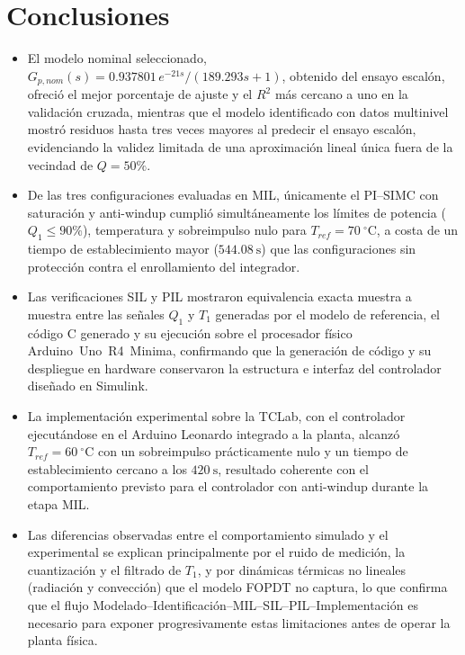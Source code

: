 \documentclass[journal]{IEEEtran}
\begin{document}
\section{Conclusiones}

\begin{itemize}
    \item El modelo nominal seleccionado, $G_{p,nom}(s)=0.937801\,e^{-21s}/(189.293s+1)$, obtenido del
    ensayo escalón, ofreció el mejor porcentaje de ajuste y el $R^2$ más cercano a uno en la validación
    cruzada, mientras que el modelo identificado con datos multinivel mostró residuos hasta tres veces
    mayores al predecir el ensayo escalón, evidenciando la validez limitada de una aproximación lineal
    única fuera de la vecindad de $Q=50\%$.
    \item De las tres configuraciones evaluadas en MIL, únicamente el PI--SIMC con saturación y
    anti-windup cumplió simultáneamente los límites de potencia ($Q_1\leq90\%$), temperatura y
    sobreimpulso nulo para $T_{ref}=70~^\circ$C, a costa de un tiempo de establecimiento mayor
    ($544.08~\mathrm{s}$) que las configuraciones sin protección contra el enrollamiento del integrador.
    \item Las verificaciones SIL y PIL mostraron equivalencia exacta muestra a muestra entre las señales
    $Q_1$ y $T_1$ generadas por el modelo de referencia, el código C generado y su ejecución sobre el
    procesador físico Arduino~Uno~R4~Minima, confirmando que la generación de código y su despliegue en
    hardware conservaron la estructura e interfaz del controlador diseñado en Simulink.
    \item La implementación experimental sobre la TCLab, con el controlador ejecutándose en el Arduino
    Leonardo integrado a la planta, alcanzó $T_{ref}=60~^\circ$C con un sobreimpulso prácticamente nulo
    y un tiempo de establecimiento cercano a los $420~\mathrm{s}$, resultado coherente con el
    comportamiento previsto para el controlador con anti-windup durante la etapa MIL.
    \item Las diferencias observadas entre el comportamiento simulado y el experimental se explican
    principalmente por el ruido de medición, la cuantización y el filtrado de $T_1$, y por dinámicas
    térmicas no lineales (radiación y convección) que el modelo FOPDT no captura, lo que confirma que el
    flujo Modelado--Identificación--MIL--SIL--PIL--Implementación es necesario para exponer
    progresivamente estas limitaciones antes de operar la planta física.
\end{itemize}
\end{document}
